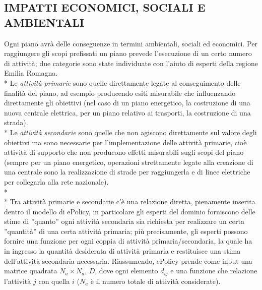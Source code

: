 \documentclass[12pt,a4paper,openright,twoside]{report}
\begin{document}
\subsection[IMPATTI]{\nohyphens{IMPATTI ECONOMICI, SOCIALI E AMBIENTALI}}
Ogni piano avrà delle conseguenze in termini ambientali, sociali ed economici. Per raggiungere gli scopi prefissati un piano prevede l'esecuzione di un certo numero di attività; due categorie sono state individuate con l'aiuto di esperti della regione Emilia Romagna.\\*
Le \emph{attività primarie} sono quelle direttamente legate al conseguimento delle finalità del piano, ad esempio producendo esiti misurabile che influenzando direttamente gli obiettivi (nel caso di un piano energetico, la costruzione di una nuova centrale elettrica, per un piano relativo ai trasporti, la costruzione di una strada).\\*
Le \emph{attività secondarie} sono quelle che non agiscono direttamente sul valore degli obiettivi ma sono necessarie per l'implementazione delle attività primarie, cioè attività di supporto che non producono effetti misurabili sugli scopi del piano (sempre per un piano energetico, operazioni strettamente legate alla creazione di una centrale sono la realizzazione di strade per raggiungerla e di linee elettriche per collegarla alla rete nazionale).\\*\\*
Tra attività primarie e secondarie c'è una relazione diretta, pienamente inserita dentro il modello di ePolicy, in particolare gli esperti del dominio forniscono delle stime di ''quanto'' ogni attività secondaria sia richiesta per realizzare un  certa ''quantità'' di una certa attività primaria; più precisamente, gli esperti possono fornire una funzione per ogni coppia di attività primaria/secondaria, la quale ha in ingresso la quantità desiderata di attività primaria e restituisce una stima dell'attività secondaria necessaria. Riassumendo, ePolicy prende come input una matrice quadrata $N_a \times N_a$, $D$, dove ogni elemento $d_{ij}$ e una funzione che relazione l'attività $j$ con quella $i$ ($N_a$ è il numero totale di attività considerate).
\end{document}
